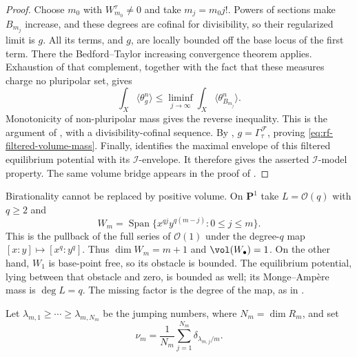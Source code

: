 \begin{proof}
Choose $m_0$ with $W^\tau_{m_0}\ne0$ and take $m_j=m_0j!$. Powers of sections make $B_{m_j}$ increase, and these degrees are cofinal for divisibility, so their regularized limit is $g$. All its terms, and $g$, are locally bounded off the base locus of the first term. There the Bedford--Taylor increasing convergence theorem applies. Exhaustion of that complement, together with the fact that these measures charge no pluripolar set, gives
\[
 \int_X\langle\theta_g^n\rangle
    \leq\liminf_{j\to\infty}\int_X\langle\theta_{B_{m_j}}^n\rangle.
\]
Monotonicity of non-pluripolar mass gives the reverse inequality. This is the argument of \cite[Proposition~19, p.~240]{His13}, with a divisibility-cofinal sequence. By , $g=\Gamma^{\mathcal F}_\tau$, proving \eqref{eq:rf-filtered-volume-mass}. Finally, \cite[Lemma~4.5, p.~302]{DXZ23} identifies the maximal envelope of this filtered equilibrium potential with its $\mathcal I$-envelope. It therefore gives the asserted $\mathcal I$-model property. The same volume bridge appears in the proof of \cite[Proposition~4.6, p.~302]{DXZ23}.
\end{proof}

\begin{example}\label{ex:rf-nonbirational-volume-mass}
Birationality cannot be replaced by positive volume. On $\mathbf P^1$ take $L=\mathcal O(q)$ with $q\geq2$ and
\[
 W_m=\operatorname{Span}\{x^{qj}y^{q(m-j)}:0\leq j\leq m\}.
\]
This is the pullback of the full series of $\mathcal O(1)$ under the degree-$q$ map $[x:y]\mapsto[x^q:y^q]$. Thus $\dim W_m=m+1$ and $\vol(W_\bullet)=1$. On the other hand, $W_1$ is base-point free, so its obstacle is bounded. The equilibrium potential, lying between that obstacle and zero, is bounded as well; its Monge--Amp\`ere mass is $\deg L=q$. The missing factor is the degree of the map, as in \cite[Example~12 and Remarks~18 and~20]{His13}.
\end{example}

Let $\lambda_{m,1}\geq\cdots\geq\lambda_{m,N_m}$ be the jumping numbers, where $N_m=\dim R_m$, and set
\[
 \nu_m=\frac1{N_m}\sum_{j=1}^{N_m}
                 \delta_{\lambda_{m,j}/m}.
\tag{65.27}\label{eq:rf-spectral-measure}
\]

